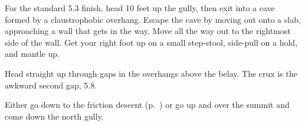 \documentclass{tahquitz}
\begin{document}
 For the standard 5.3 finish, head 10 feet up the gully,
then exit into a cave formed by a claustrophobic overhang.
Escape the cave by moving out onto a slab, approaching
a wall that gets in the way.
Move all the way out to the rightmost side of
the wall. Get your right foot up on a small step-stool,
side-pull on a hold, and mantle up.

 Head straight up through gaps in the overhangs above
the belay. The crux is the awkward second gap, 5.8.

Either go down to the friction descent (p.~\pageref{subsec:friction-descent})
or go up and over the summit
and come down the north gully.

\myfooter\vfill %
\end{document}
